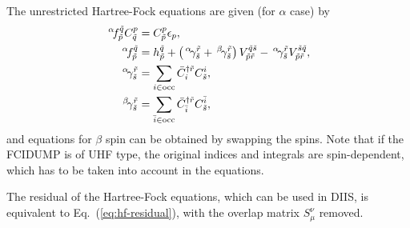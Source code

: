\documentclass[a4paper,12pt,oneside]{book}
\newcommand{\eq}[1]{Eq.~(\ref{#1})}
\newcommand{\spa}[1]{{#1}}
\newcommand{\spb}[1]{\bar{#1}}
\newcommand{\dg}{\dagger}
\newcommand{\pre}[1]{\,#1\!}
\begin{document}
The unrestricted Hartree-Fock equations are given (for $\alpha$ case) by
\begin{equation}
\begin{aligned}
\pre{^\alpha}f_{\tilde p}^{\tilde q} C_{\tilde q}^{\spa p} &= C_{\tilde p}^{\spa p} \epsilon_{\spa p},\\
\pre{^\alpha}f_{\tilde p}^{\tilde q} &= h_{\tilde p}^{\tilde q} +
\left(\pre{^\alpha}\gamma^{\tilde r}_{\tilde s} + \pre{^\beta}\gamma^{\tilde r}_{\tilde s}\right) 
V_{\tilde p\tilde r}^{\tilde q\tilde s}
- \pre{^\alpha}\gamma^{\tilde r}_{\tilde s}V_{\tilde p\tilde r}^{\tilde s\tilde q},\\
\pre{^\alpha}\gamma^{\tilde r}_{\tilde s} &= \sum_{\spa i \in \rm occ} \bar C^{\dg \tilde r}_{\spa i} C_{\tilde s}^{\spa i},\\
\pre{^\beta}\gamma^{\tilde r}_{\tilde s} &=  \sum_{\spb i \in \rm occ} \bar C^{\dg \tilde r}_{\spb i} C_{\tilde s}^{\spb i},
\end{aligned}
\end{equation}
and equations for $\beta$ spin can be obtained by swapping the spins.
Note that if the FCIDUMP is of UHF type, the original indices and integrals are spin-dependent,
which has to be taken into account in the equations.

The residual of the Hartree-Fock equations, which can be used in DIIS, is equivalent to
\eq{eq:hf-residual}, with the overlap matrix $S_{\mu}^{\nu}$ removed.
\end{document}
